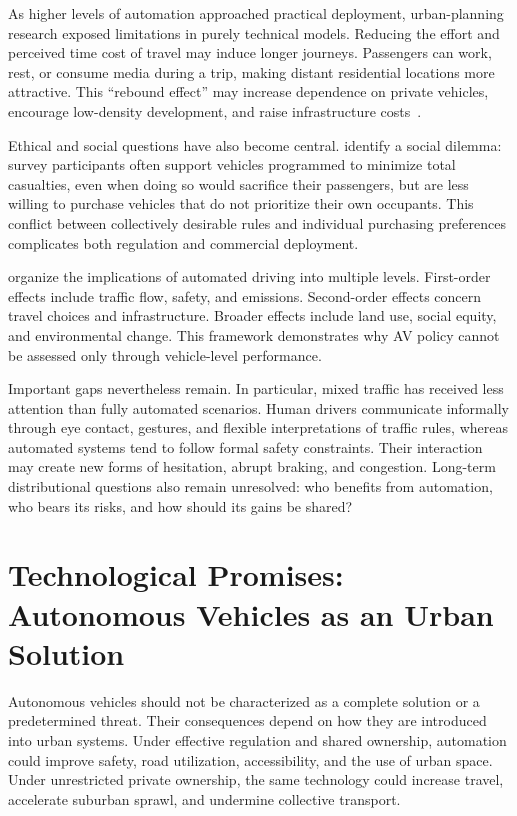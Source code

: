 \documentclass[12pt,a4paper]{article}
\begin{document}
As higher levels of automation approached practical deployment, urban-planning research exposed limitations in purely technical models. Reducing the effort and perceived time cost of travel may induce longer journeys. Passengers can work, rest, or consume media during a trip, making distant residential locations more attractive. This ``rebound effect'' may increase dependence on private vehicles, encourage low-density development, and raise infrastructure costs~\citep{litman2020}.

Ethical and social questions have also become central. \citet{bonnefon2016} identify a social dilemma: survey participants often support vehicles programmed to minimize total casualties, even when doing so would sacrifice their passengers, but are less willing to purchase vehicles that do not prioritize their own occupants. This conflict between collectively desirable rules and individual purchasing preferences complicates both regulation and commercial deployment.

\citet{milakis2017} organize the implications of automated driving into multiple levels. First-order effects include traffic flow, safety, and emissions. Second-order effects concern travel choices and infrastructure. Broader effects include land use, social equity, and environmental change. This framework demonstrates why AV policy cannot be assessed only through vehicle-level performance.

Important gaps nevertheless remain. In particular, mixed traffic has received less attention than fully automated scenarios. Human drivers communicate informally through eye contact, gestures, and flexible interpretations of traffic rules, whereas automated systems tend to follow formal safety constraints. Their interaction may create new forms of hesitation, abrupt braking, and congestion. Long-term distributional questions also remain unresolved: who benefits from automation, who bears its risks, and how should its gains be shared?

\section{Technological Promises: Autonomous Vehicles as an Urban Solution}

Autonomous vehicles should not be characterized as a complete solution or a predetermined threat. Their consequences depend on how they are introduced into urban systems. Under effective regulation and shared ownership, automation could improve safety, road utilization, accessibility, and the use of urban space. Under unrestricted private ownership, the same technology could increase travel, accelerate suburban sprawl, and undermine collective transport.
\end{document}
